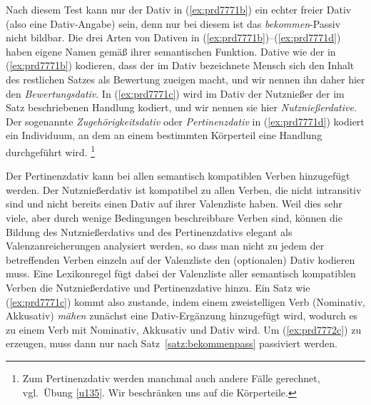 \begin{exe}
  \ex\label{ex:prd7772} 
  \begin{xlist}
  \end{xlist}
\end{exe}


Nach diesem Test kann nur der Dativ in (\ref{ex:prd7771b}) ein echter freier Dativ (also eine Dativ-Angabe) sein, denn nur bei diesem ist das \textit{bekommen}-Passiv nicht bildbar.
Die drei Arten von Dativen in (\ref{ex:prd7771b})--(\ref{ex:prd7771d}) haben eigene Namen gemäß ihrer semantischen Funktion.
Dative wie der in (\ref{ex:prd7771b}) kodieren, dass der im Dativ bezeichnete Mensch sich den Inhalt des restlichen Satzes als Bewertung zueigen macht, und wir nennen ihn daher hier den \textit{Bewertungsdativ}.
In (\ref{ex:prd7771c}) wird im Dativ der Nutznießer der im Satz beschriebenen Handlung kodiert, und wir nennen sie hier \textit{Nutznießerdative}.
Der sogenannte \textit{Zugehörigkeitsdativ} oder \textit{Pertinenzdativ} in (\ref{ex:prd7771d}) kodiert ein Individuum, an dem an einem bestimmten Körperteil eine Handlung durchgeführt wird.%
\footnote{Zum Pertinenzdativ werden manchmal auch andere Fälle gerechnet, vgl.\ Übung \ref{u135}.
Wir beschränken uns auf die Körperteile.}


Der Pertinenzdativ kann bei allen semantisch kompatiblen Verben hinzugefügt werden.
Der Nutznießerdativ ist kompatibel zu allen Verben, die nicht intransitiv sind und nicht bereits einen Dativ auf ihrer Valenzliste haben.
Weil dies sehr viele, aber durch wenige Bedingungen beschreibbare Verben sind, können die Bildung des Nutznießerdativs und des Pertinenzdativs elegant als Valenzanreicherungen analysiert werden, so dass man nicht zu jedem der betreffenden Verben einzeln auf der Valenzliste den (optionalen) Dativ kodieren muss.
Eine Lexikonregel fügt dabei der Valenzliste aller semantisch kompatiblen Verben die Nutznießerdative und Pertinenzdative hinzu.
Ein Satz wie (\ref{ex:prd7771c}) kommt also zustande, indem einem zweistelligen Verb (Nominativ, Akkusativ) \textit{mähen} zunächst eine Dativ-Ergänzung hinzugefügt wird, wodurch es zu einem Verb mit Nominativ,  Akkusativ und Dativ wird.
Um (\ref{ex:prd7772c}) zu erzeugen, muss dann nur nach Satz~\ref{satz:bekommenpass} passiviert werden.

